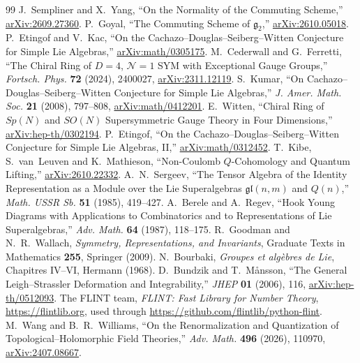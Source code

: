 \documentclass[11pt]{article}
\numberwithin{equation}{section}
\numberwithin{figure}{section}
\numberwithin{table}{section}
\begin{document}
\begin{thebibliography}{99}
J.~Sempliner and X.~Yang, ``On the Normality of the Commuting Scheme,'' \href{https://arxiv.org/abs/2609.27360}{arXiv:2609.27360}.
P.~Goyal, ``The Commuting Scheme of $\mathfrak g_2$,'' \href{https://arxiv.org/abs/2610.05018}{arXiv:2610.05018}.
P.~Etingof and V.~Kac, ``On the Cachazo--Douglas--Seiberg--Witten Conjecture for Simple Lie Algebras,'' \href{https://arxiv.org/abs/math/0305175}{arXiv:math/0305175}.
M.~Cederwall and G.~Ferretti, ``The Chiral Ring of $D=4$, $\mathcal N=1$ SYM with Exceptional Gauge Groups,'' \emph{Fortsch. Phys.} \textbf{72} (2024), 2400027, \href{https://arxiv.org/abs/2311.12119}{arXiv:2311.12119}.
S.~Kumar, ``On Cachazo--Douglas--Seiberg--Witten Conjecture for Simple Lie Algebras,'' \emph{J. Amer. Math. Soc.} \textbf{21} (2008), 797--808, \href{https://arxiv.org/abs/math/0412201}{arXiv:math/0412201}.
E.~Witten, ``Chiral Ring of $Sp(N)$ and $SO(N)$ Supersymmetric Gauge Theory in Four Dimensions,'' \href{https://arxiv.org/abs/hep-th/0302194}{arXiv:hep-th/0302194}.
P.~Etingof, ``On the Cachazo--Douglas--Seiberg--Witten Conjecture for Simple Lie Algebras, II,'' \href{https://arxiv.org/abs/math/0312452}{arXiv:math/0312452}.
T.~Kibe, S.~van~Leuven and K.~Mathieson, ``Non-Coulomb $Q$-Cohomology and Quantum Lifting,'' \href{https://arxiv.org/abs/2610.22332}{arXiv:2610.22332}.
A.~N.~Sergeev, ``The Tensor Algebra of the Identity Representation as a Module over the Lie Superalgebras $\mathfrak{gl}(n,m)$ and $Q(n)$,'' \emph{Math. USSR Sb.} \textbf{51} (1985), 419--427.
A.~Berele and A.~Regev, ``Hook Young Diagrams with Applications to Combinatorics and to Representations of Lie Superalgebras,'' \emph{Adv. Math.} \textbf{64} (1987), 118--175.
R.~Goodman and N.~R.~Wallach, \emph{Symmetry, Representations, and Invariants}, Graduate Texts in Mathematics \textbf{255}, Springer (2009).
N.~Bourbaki, \emph{Groupes et alg\`ebres de Lie}, Chapitres IV--VI, Hermann (1968).
D.~Bundzik and T.~M{\aa}nsson, ``The General Leigh--Strassler Deformation and Integrability,'' \emph{JHEP} \textbf{01} (2006), 116, \href{https://arxiv.org/abs/hep-th/0512093}{arXiv:hep-th/0512093}.
The FLINT team, \emph{FLINT: Fast Library for Number Theory}, \url{https://flintlib.org}, used through \url{https://github.com/flintlib/python-flint}.
M.~Wang and B.~R.~Williams, ``On the Renormalization and Quantization of Topological--Holomorphic Field Theories,'' \emph{Adv. Math.} \textbf{496} (2026), 110970, \href{https://arxiv.org/abs/2407.08667}{arXiv:2407.08667}.
\end{thebibliography}
\end{document}
